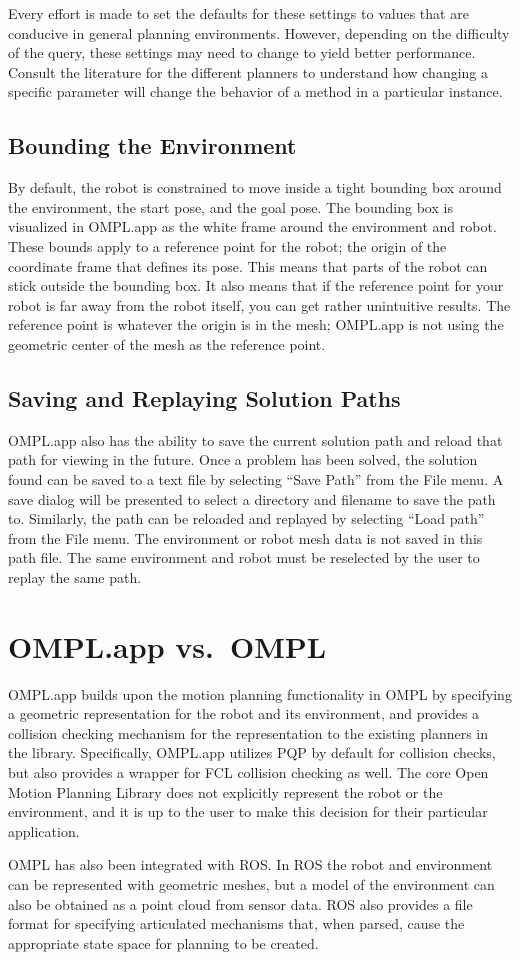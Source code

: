 Every effort is made to set the defaults for these settings to values that are
conducive in general planning environments.  However, depending on the
difficulty of the query, these settings may need to change to yield better
performance.  Consult the literature for the different planners to understand
how changing a specific parameter will change the behavior of a method in a
particular instance.

\subsection {Bounding the Environment}
By default, the robot is constrained to move inside a tight bounding box around
the environment, the start pose, and the goal pose. The bounding box is
visualized in OMPL.app as the white frame around the environment and robot.
These bounds apply to a reference point for the robot; the origin of the
coordinate frame that defines its pose. This means that parts of the robot can
stick outside the bounding box. It also means that if the reference point for
your robot is far away from the robot itself, you can get rather unintuitive
results. The reference point is whatever the origin is in the mesh; OMPL.app is
not using the geometric center of the mesh as the reference point.

\subsection {Saving and Replaying Solution Paths}
OMPL.app also has the ability to save the current solution path and reload that
path for viewing in the future.  Once a problem has been solved, the solution
found can be saved to a text file by selecting ``Save Path'' from the File menu.
A save dialog will be presented to select a directory and filename to save the
path to. Similarly, the path can be reloaded and replayed by selecting ``Load
path'' from the File menu.  The environment or robot mesh data is not saved in
this path file.  The same environment and robot must be reselected by the user
to replay the same path.

\section {OMPL.app vs.\ OMPL}
OMPL.app builds upon the motion planning functionality in OMPL by specifying
a geometric representation for the robot and its environment, and provides
a collision checking mechanism for the representation to the existing planners
in the library.  Specifically, OMPL.app utilizes PQP \cite{Larsen:2000} by
default for collision checks, but also provides a wrapper for FCL
\cite{Jia:2011} collision checking as well. The core Open Motion Planning
Library does not explicitly represent the robot or the environment, and it is
up to the user to make this decision for their particular application.

OMPL has also been integrated with ROS. In ROS the robot and environment can
be represented with geometric meshes, but a model of the environment can also
be obtained as a point cloud from sensor data. ROS also provides a file
format for specifying articulated mechanisms that, when parsed, cause the
appropriate state space for planning to be created.
